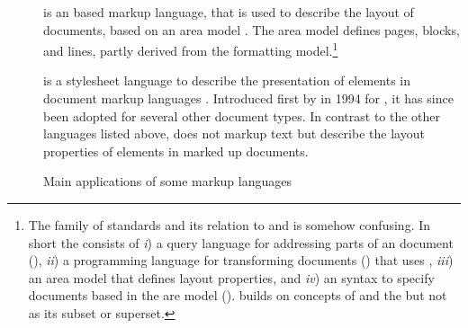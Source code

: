 \begin{description}
\item[]
is an  based markup language, that is used to describe the layout
of documents, based on an area model \cite[par. 6 and 4]{Berglund2006}. The 
area model defines pages, blocks, and lines, partly derived from the 
formatting model.\footnote{The  family of standards and its
relation to  and  is somehow confusing. In short
the  consists of \emph{i}) a
query language for addressing parts of an  document (),
\emph{ii}) a programming language for transforming  documents
() that uses , \emph{iii}) an area model that defines
layout properties, and \emph{iv}) an  syntax to specify documents
based in the are model ().  builds on concepts of
 and the  but not as its subset or superset.\label{fn:xsl}}

\item[] is a stylesheet language
to describe the presentation of elements in document markup languages
\cite{Bos2009}. Introduced first by  in 1994 for
, it has since been adopted for several other document types. In
contrast to the other languages listed above,  does not markup text
but describe the layout properties of elements in marked up documents.
\end{description}



\begin{figure}
\centering
{}
\caption{Main applications of some markup languages}
\label{fig:mlapps}
\end{figure}

